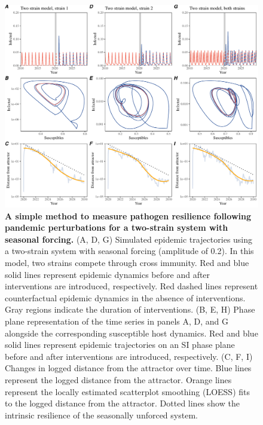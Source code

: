 \documentclass[12pt]{article}
\begin{document}
\begin{figure}[!th]
\includegraphics[width=\textwidth]{../figure2/figure2_multi.pdf}
\caption{
\textbf{A simple method to measure pathogen resilience following pandemic perturbations for a two-strain system with seasonal forcing.}
(A, D, G) Simulated epidemic trajectories using a two-strain system with seasonal forcing (amplitude of 0.2).
In this model, two strains compete through cross immunity.
Red and blue solid lines represent epidemic dynamics before and after interventions are introduced, respectively.
Red dashed lines represent counterfactual epidemic dynamics in the absence of interventions.
Gray regions indicate the duration of interventions.
(B, E, H) Phase plane representation of the time series in panels A, D, and G alongside the corresponding susceptible host dynamics.
Red and blue solid lines represent epidemic trajectories on an SI phase plane before and after interventions are introduced, respectively.
(C, F, I) Changes in logged distance from the attractor over time.
Blue lines represent the logged distance from the attractor.
Orange lines represent the locally estimated scatterplot smoothing (LOESS) fits to the logged distance from the attractor.
Dotted lines show the intrinsic resilience of the seasonally unforced system.
}
\end{figure}

\pagebreak
\end{document}
